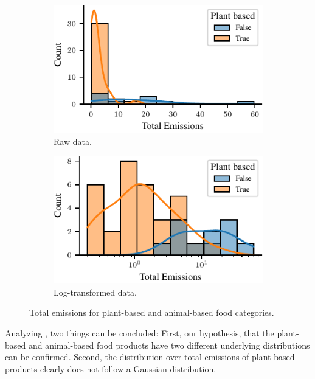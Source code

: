 \documentclass{article}
\begin{document}
\begin{figure}[h]
  \centering
  \begin{subfigure}[b]{0.49\textwidth}
    \includegraphics[width=\textwidth]{figures/emissions.pdf}
    \caption{Raw data.}
    \label{fig:emissions}
  \end{subfigure}%
  \hfill
  \begin{subfigure}[b]{0.49\textwidth}
    \includegraphics[width=\textwidth]{figures/emissions-log.pdf}
    \caption{Log-transformed data.}
    \label{fig:emissions-log}
  \end{subfigure}
  \caption{Total emissions for plant-based and animal-based food categories.}
  \label{fig:emissions}
\end{figure}

Analyzing , two things can be concluded: First, our hypothesis, that the plant-based and animal-based food products have two different underlying distributions can be confirmed. Second, the distribution over total emissions of plant-based products clearly does not follow a Gaussian distribution. 
\end{document}
